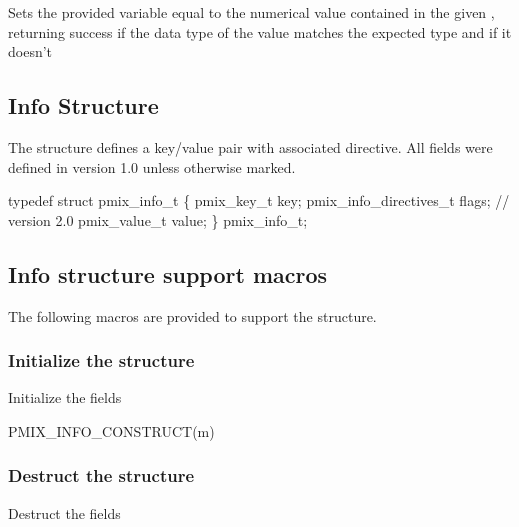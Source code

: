 Sets the provided variable equal to the numerical value contained in the given , returning success if the data type of the value matches the expected type and  if it doesn't

\subsection{Info Structure}

The  structure defines a key/value pair with associated directive. All fields were defined in version 1.0 unless otherwise marked.

\cspecificstart
\begin{codepar}
typedef struct pmix_info_t \{
    pmix_key_t key;
    pmix_info_directives_t flags;    // version 2.0
    pmix_value_t value;
\} pmix_info_t;
\end{codepar}
\cspecificend

\subsection{Info structure support macros}
The following macros are provided to support the  structure.

\subsubsection{Initialize the  structure}

Initialize the  fields

\cspecificstart
\begin{codepar}
PMIX_INFO_CONSTRUCT(m)
\end{codepar}
\cspecificend

\begin{arglist}
\end{arglist}

\subsubsection{Destruct the  structure}

Destruct the  fields

